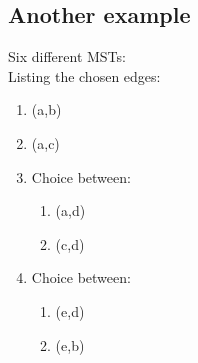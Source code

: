 \documentclass[10pt,a4paper]{article}
\begin{document}
\subsection{Another example}

Six different MSTs: \\ \hfill
Listing the chosen edges:
\begin{enumerate}
\item (a,b)
\item (a,c)
\item Choice between: \begin{enumerate}
\item (a,d)
\item (c,d)
\end{enumerate}
\item Choice between: \begin{enumerate}
\item (e,d)
\item (e,b)
\end{enumerate}
\end{enumerate}
\end{document}
